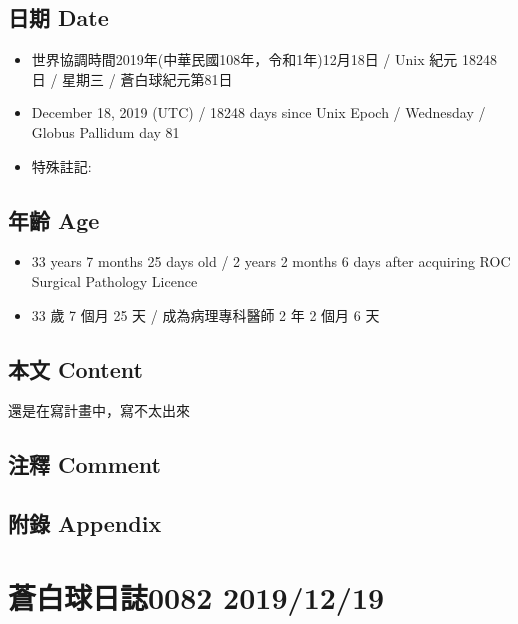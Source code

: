 \documentclass[a5paper, 12pt
]{book}
\providecommand{\tightlist}{%
  \setlength{\itemsep}{0pt}\setlength{\parskip}{0pt}}
\begin{document}
\hypertarget{ux65e5ux671f-date-17}{%
\subsection{日期 Date}\label{ux65e5ux671f-date-17}}

\begin{itemize}
\tightlist
\item
  世界協調時間2019年(中華民國108年，令和1年)12月18日 / Unix 紀元 18248
  日 / 星期三 / 蒼白球紀元第81日
\item
  December 18, 2019 (UTC) / 18248 days since Unix Epoch / Wednesday /
  Globus Pallidum day 81
\item
  特殊註記:
\end{itemize}

\hypertarget{ux5e74ux9f61-age-17}{%
\subsection{年齡 Age}\label{ux5e74ux9f61-age-17}}

\begin{itemize}
\tightlist
\item
  33 years 7 months 25 days old / 2 years 2 months 6 days after
  acquiring ROC Surgical Pathology Licence
\item
  33 歲 7 個月 25 天 / 成為病理專科醫師 2 年 2 個月 6 天
\end{itemize}

\hypertarget{ux672cux6587-content-17}{%
\subsection{本文 Content}\label{ux672cux6587-content-17}}

還是在寫計畫中，寫不太出來

\hypertarget{ux6ce8ux91cb-comment-16}{%
\subsection{注釋 Comment}\label{ux6ce8ux91cb-comment-16}}

\hypertarget{ux9644ux9304-appendix-17}{%
\subsection{附錄 Appendix}\label{ux9644ux9304-appendix-17}}

\hypertarget{ux84bcux767dux7403ux65e5ux8a8c0082-20191219}{%
\section{蒼白球日誌0082
2019/12/19}\label{ux84bcux767dux7403ux65e5ux8a8c0082-20191219}}
\end{document}

